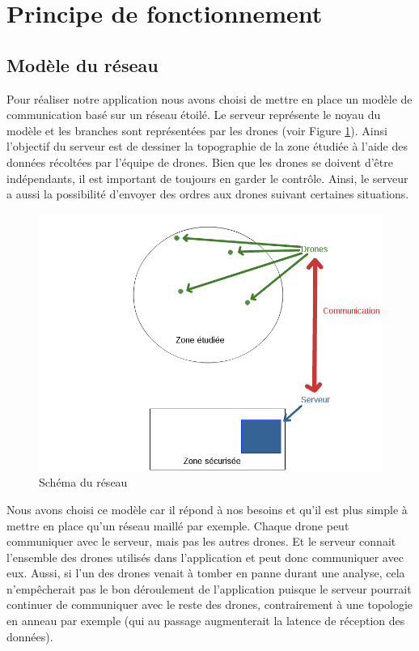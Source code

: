 \documentclass[a4paper,10pt]{report}
\begin{document}
    \section{Principe de fonctionnement}
      \subsection{Modèle du réseau}
	Pour réaliser notre application nous avons choisi de mettre en place un 
modèle de communication basé sur un réseau étoilé. Le serveur représente le 
noyau du modèle et les branches sont représentées par les drones (voir 
Figure \ref{network_schema}). Ainsi l'objectif du serveur est de dessiner la 
topographie de la zone étudiée à l'aide des données récoltées par l'équipe de 
drones. Bien que les drones se doivent d'être indépendants, il est important de 
toujours en garder le contrôle. Ainsi, le serveur a aussi la possibilité 
d'envoyer des ordres aux drones suivant certaines situations.

	\begin{figure}[htbp]
	  \centering
	  \includegraphics[scale=0.4]{img/projet_schema.png}
	  \caption{Schéma du réseau}
	  \label{network_schema}
	\end{figure}
	
	\newpage
	
	Nous avons choisi ce modèle car il répond à nos besoins et qu'il est 
plus simple à mettre en place qu'un réseau maillé par exemple. Chaque 
drone peut communiquer avec le serveur, mais pas les autres drones. Et le 
serveur connait l'ensemble des drones utilisés dans l'application et peut 
donc communiquer avec eux. Aussi, si l'un des drones venait à tomber en panne 
durant une analyse, cela n'empêcherait pas le bon déroulement de l'application 
puisque le serveur pourrait continuer de communiquer avec le reste des drones, 
contrairement à une topologie en anneau par exemple (qui au passage 
augmenterait la latence de réception des données).
      
\end{document}
